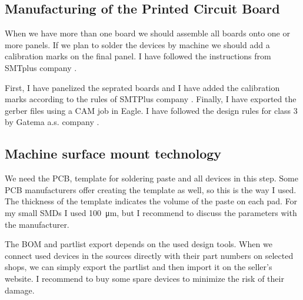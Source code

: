 \subsection{Manufacturing of the Printed Circuit Board}
When we have more than one board we should assemble all boards onto one or more panels. If we plan to solder the devices by machine we should add a calibration marks on the final panel. I have followed the instructions from SMTplus company \cite{SMTplusManual}.

First, I have panelized the seprated boards and I have added the calibration marks according to the rules of SMTPlus company \cite{SMTPlusDesignRules}. Finally, I have exported the gerber files using a CAM job \cite{GatemaCAMjob} in Eagle. I have followed the design rules for class 3 by Gatema a.s. company \cite{GatemaDesignRules}.

\subsection{Machine surface mount technology}
We need the PCB, template for soldering paste and all devices in this step. Some PCB manufacturers offer creating the template as well, so this is the way I used. The thickness of the template indicates the volume of the paste on each pad. For my small SMDs I used \SI{100}{\micro\meter}, but I recommend to discuss the parameters with the manufacturer.

The BOM and partlist export depends on the used design tools. When we connect used devices in the sources directly with their part numbers on selected shops, we can simply export the partlist and then import it on the seller's website. I recommend to buy some spare devices to minimize the risk of their damage.

